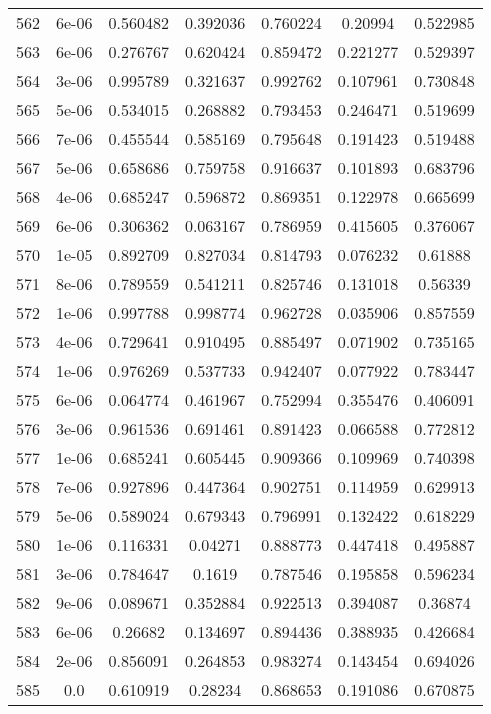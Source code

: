 \begin{table}
\begin{tabular*}{\linewidth}{c|c|c|c|c|c|c}
562 & 6e-06 & 0.560482 & 0.392036 & 0.760224 & 0.20994 & 0.522985\\
563 & 6e-06 & 0.276767 & 0.620424 & 0.859472 & 0.221277 & 0.529397\\
564 & 3e-06 & 0.995789 & 0.321637 & 0.992762 & 0.107961 & 0.730848\\
565 & 5e-06 & 0.534015 & 0.268882 & 0.793453 & 0.246471 & 0.519699\\
566 & 7e-06 & 0.455544 & 0.585169 & 0.795648 & 0.191423 & 0.519488\\
567 & 5e-06 & 0.658686 & 0.759758 & 0.916637 & 0.101893 & 0.683796\\
568 & 4e-06 & 0.685247 & 0.596872 & 0.869351 & 0.122978 & 0.665699\\
569 & 6e-06 & 0.306362 & 0.063167 & 0.786959 & 0.415605 & 0.376067\\
570 & 1e-05 & 0.892709 & 0.827034 & 0.814793 & 0.076232 & 0.61888\\
571 & 8e-06 & 0.789559 & 0.541211 & 0.825746 & 0.131018 & 0.56339\\
572 & 1e-06 & 0.997788 & 0.998774 & 0.962728 & 0.035906 & 0.857559\\
573 & 4e-06 & 0.729641 & 0.910495 & 0.885497 & 0.071902 & 0.735165\\
574 & 1e-06 & 0.976269 & 0.537733 & 0.942407 & 0.077922 & 0.783447\\
575 & 6e-06 & 0.064774 & 0.461967 & 0.752994 & 0.355476 & 0.406091\\
576 & 3e-06 & 0.961536 & 0.691461 & 0.891423 & 0.066588 & 0.772812\\
577 & 1e-06 & 0.685241 & 0.605445 & 0.909366 & 0.109969 & 0.740398\\
578 & 7e-06 & 0.927896 & 0.447364 & 0.902751 & 0.114959 & 0.629913\\
579 & 5e-06 & 0.589024 & 0.679343 & 0.796991 & 0.132422 & 0.618229\\
580 & 1e-06 & 0.116331 & 0.04271 & 0.888773 & 0.447418 & 0.495887\\
581 & 3e-06 & 0.784647 & 0.1619 & 0.787546 & 0.195858 & 0.596234\\
582 & 9e-06 & 0.089671 & 0.352884 & 0.922513 & 0.394087 & 0.36874\\
583 & 6e-06 & 0.26682 & 0.134697 & 0.894436 & 0.388935 & 0.426684\\
584 & 2e-06 & 0.856091 & 0.264853 & 0.983274 & 0.143454 & 0.694026\\
585 & 0.0 & 0.610919 & 0.28234 & 0.868653 & 0.191086 & 0.670875\\
\end{tabular*}
\end{table}
